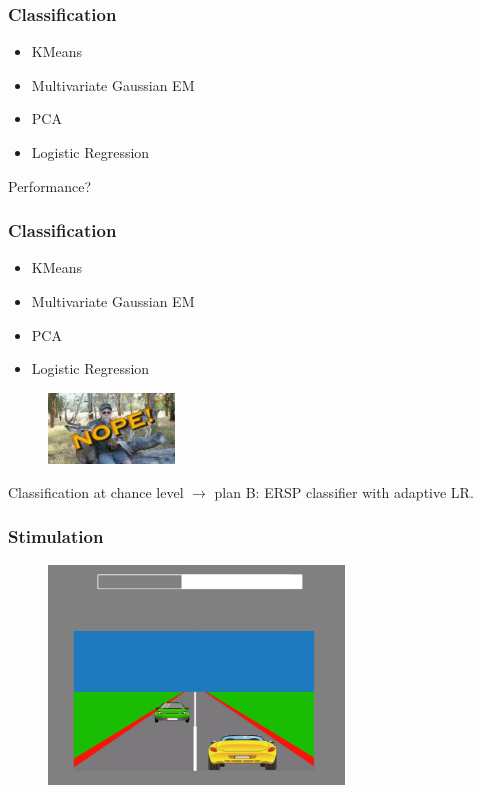 \documentclass{beamer}
\begin{document}
\begin{frame}
  \frametitle{Classification}

  \begin{itemize}
    \item KMeans
    \item Multivariate Gaussian EM
    \item PCA
    \item Logistic Regression
  \end{itemize}
  Performance?
\end{frame}

\begin{frame}
  \frametitle{Classification}
  \begin{itemize}
    \item KMeans     
    \item Multivariate Gaussian EM
    \item PCA
    \item Logistic Regression
  \end{itemize}
  \begin{figure}
    \includegraphics[width=0.3\textwidth, right]{chucktesta.jpeg}
  \end{figure}
  Classification at chance level $\rightarrow$ plan B: ERSP classifier with adaptive LR.

\end{frame}

\begin{frame}
  \frametitle{Stimulation}

  \begin{figure}
    \includegraphics[width=0.7\textwidth]{brain_racer.png}
  \end{figure}

\end{frame}
\end{document}
